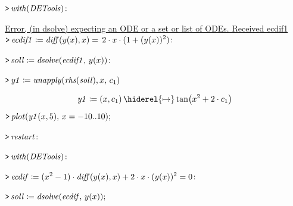 \documentclass{article}
\begin{document}
\lstset{basicstyle=\ttfamily,breaklines=true,columns=flexible}
\pagestyle{empty}
\mapleinput
{$ \displaystyle \texttt{>\,} \mathit{with} (\mathit{DETools})\colon  $}

\href{http://www.maplesoft.com/support/help/errors/view.aspx?path=Error,%20(in%20dsolve)%20expecting%20an%20ODE%20or%20a%20set%20or%20list%20of%20ODEs.%20Received%20ecdif1}{Error, (in dsolve) expecting an ODE or a set or list of ODEs. Received ecdif1}\mapleinput
{$ \displaystyle \texttt{>\,} \mathit{ecdif1} \coloneqq \mathit{diff} (y (x),x)=\,2\cdot x \cdot (1+(y (x))^{2})\colon  $}

\mapleinput
{$ \displaystyle \texttt{>\,} \mathit{soll} \coloneqq \mathit{dsolve} (\mathit{ecdif1} ,\,y (x))\colon  $}

\mapleinput
{$ \displaystyle \texttt{>\,} \mathit{y1} \coloneqq \mathit{unapply} (\mathit{rhs} (\mathit{soll}),x ,\,c_{1}) $}

\begin{dmath}\label{(1)}
\mathit{y1} \coloneqq \left(x ,c_{1}\right)\hiderel{\mapsto }\tan \! \left(x^{2}+2\cdot c_{1}\right)
\end{dmath}
\mapleinput
{$ \displaystyle \texttt{>\,} \mathit{plot} (\mathit{y1} (x ,5),\,x =-10..10); $}

{}
\mapleinput
{$ \displaystyle \texttt{>\,} \mathit{restart} \colon  $}

\mapleinput
{$ \displaystyle \texttt{>\,} \mathit{with} (\mathit{DETools})\colon  $}

\mapleinput
{$ \displaystyle \texttt{>\,} \mathit{ecdif} \coloneqq (x^{2}-1)\cdot \mathit{diff} (y (x),x)+2\cdot x \cdot (y (x))^{2}=0\colon  $}

\mapleinput
{$ \displaystyle \texttt{>\,} \mathit{soll} \coloneqq \mathit{dsolve} (\mathit{ecdif} ,\,y (x)); $}
\end{document}
